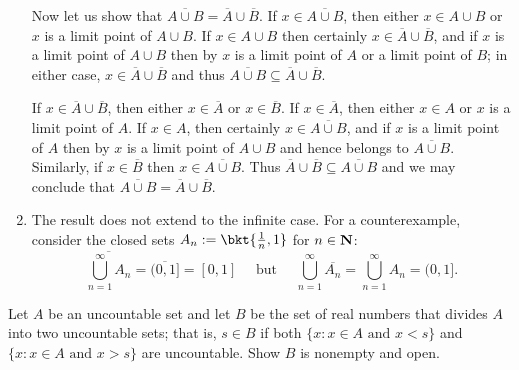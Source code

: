 \documentclass{lew98_solutions}
\begin{document}
\begin{solution}
\begin{enumerate}
        Now let us show that \( \overline{A \cup B} = \overline{A} \cup \overline{B} \). If \( x \in \overline{A \cup B} \), then either \( x \in A \cup B \) or \( x \) is a limit point of \( A \cup B \). If \( x \in A \cup B \) then certainly \( x \in \overline{A} \cup \overline{B} \), and if \( x \) is a limit point of \( A \cup B \) then by  \( x \) is a limit point of \( A \) or a limit point of \( B \); in either case, \( x \in \overline{A} \cup \overline{B} \) and thus \( \overline{A \cup B} \subseteq \overline{A} \cup \overline{B} \).
        
        If \( x \in \overline{A} \cup \overline{B} \), then either \( x \in \overline{A} \) or \( x \in \overline{B} \). If \( x \in \overline{A} \), then either \( x \in A \) or \( x \) is a limit point of \( A \). If \( x \in A \), then certainly \( x \in \overline{A \cup B} \), and if \( x \) is a limit point of \( A \) then by  \( x \) is a limit point of \( A \cup B \) and hence belongs to \( \overline{A \cup B} \). Similarly, if \( x \in \overline{B} \) then \( x \in \overline{A \cup B} \). Thus \( \overline{A} \cup \overline{B} \subseteq \overline{A \cup B} \) and we may conclude that \( \overline{A \cup B} = \overline{A} \cup \overline{B} \).

        \item The result does not extend to the infinite case. For a counterexample, consider the closed sets \( A_n := \bkt{ \tfrac{1}{n}, 1 } \) for \( n \in \mathbf{N} \):
        \[
            \overline{\bigcup_{n=1}^{\infty} A_n} = \overline{(0, 1]} = [0, 1] \quad \text{ but } \quad \bigcup_{n=1}^{\infty} \overline{A_n} = \bigcup_{n=1}^{\infty} A_n = (0, 1].
        \]
    \end{enumerate}
\end{solution}

\begin{exercise}
\label{ex:3.2.12}
    Let \( A \) be an uncountable set and let \( B \) be the set of real numbers that divides \( A \) into two uncountable sets; that is, \( s \in B \) if both \( \{ x : x \in A \text{ and } x < s \} \) and \( \{ x : x \in A \text{ and } x > s \} \) are uncountable. Show \( B \) is nonempty and open.
\end{exercise}
\end{document}
